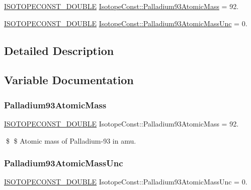 \begin{DoxyCompactItemize}
\item 
\mbox{\hyperlink{group___isotope_const-_macros_ga8f45a7272ce02c0b4c65c44636ed719a}{I\+S\+O\+T\+O\+P\+E\+C\+O\+N\+S\+T\+\_\+\+D\+O\+U\+B\+LE}} \mbox{\hyperlink{group___isotope_const-_palladium-_pd93_gae0910a4ff8095686d7cd10d73ea9db16}{Isotope\+Const\+::\+Palladium93\+Atomic\+Mass}} = 92.
\item 
\mbox{\hyperlink{group___isotope_const-_macros_ga8f45a7272ce02c0b4c65c44636ed719a}{I\+S\+O\+T\+O\+P\+E\+C\+O\+N\+S\+T\+\_\+\+D\+O\+U\+B\+LE}} \mbox{\hyperlink{group___isotope_const-_palladium-_pd93_ga9dcb5bc497d3ce207c8c04f518042c93}{Isotope\+Const\+::\+Palladium93\+Atomic\+Mass\+Unc}} = 0.
\end{DoxyCompactItemize}


\subsection{Detailed Description}


\subsection{Variable Documentation}
\mbox{\label{group___isotope_const-_palladium-_pd93_gae0910a4ff8095686d7cd10d73ea9db16}} 
\subsubsection{\texorpdfstring{Palladium93\+Atomic\+Mass}{Palladium93AtomicMass}}
{\footnotesize\ttfamily \mbox{\hyperlink{group___isotope_const-_macros_ga8f45a7272ce02c0b4c65c44636ed719a}{I\+S\+O\+T\+O\+P\+E\+C\+O\+N\+S\+T\+\_\+\+D\+O\+U\+B\+LE}} Isotope\+Const\+::\+Palladium93\+Atomic\+Mass = 92.}

\$ \$ Atomic mass of Palladium-\/93 in amu. \mbox{\label{group___isotope_const-_palladium-_pd93_ga9dcb5bc497d3ce207c8c04f518042c93}} 
\subsubsection{\texorpdfstring{Palladium93\+Atomic\+Mass\+Unc}{Palladium93AtomicMassUnc}}
{\footnotesize\ttfamily \mbox{\hyperlink{group___isotope_const-_macros_ga8f45a7272ce02c0b4c65c44636ed719a}{I\+S\+O\+T\+O\+P\+E\+C\+O\+N\+S\+T\+\_\+\+D\+O\+U\+B\+LE}} Isotope\+Const\+::\+Palladium93\+Atomic\+Mass\+Unc = 0.}

